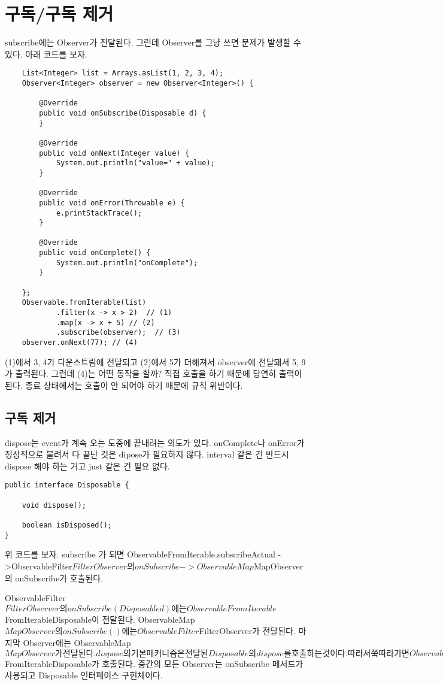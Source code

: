 \documentclass{book}
\begin{document}
\section{구독/구독 제거}
subscribe에는 Observer가 전달된다. 그런데 Observer를 그냥 쓰면 문제가 발생할 수 있다.
아래 코드를 보자.
\begin{verbatim}
	List<Integer> list = Arrays.asList(1, 2, 3, 4);
	Observer<Integer> observer = new Observer<Integer>() {

		@Override
		public void onSubscribe(Disposable d) {
		}

		@Override
		public void onNext(Integer value) {
			System.out.println("value=" + value);
		}

		@Override
		public void onError(Throwable e) {
			e.printStackTrace();
		}

		@Override
		public void onComplete() {
			System.out.println("onComplete");
		}

	};
	Observable.fromIterable(list)
			.filter(x -> x > 2)  // (1)
			.map(x -> x + 5) // (2)
			.subscribe(observer);  // (3)
	observer.onNext(77); // (4)		
\end{verbatim}
(1)에서 3, 4가 다운스트림에 전달되고 (2)에서 5가 더해져서 observer에 전달돼서 5, 9가 출력된다.
그런데 (4)는 어떤 동작을 할까? 
직접 호출을 하기 때문에 당연히 출력이 된다.
종료 상태에서는 호출이 안 되어야 하기 때문에 규칙 위반이다.


\subsection{구독 제거}
dispose는 event가 계속 오는 도중에 끝내려는 의도가 있다. onComplete나 onError가 정상적으로 불려서 다 끝난 것은 dipose가 필요하지 않다.
interval 같은 건 반드시 dispose  해야 하는 거고 just 같은 건 필요 없다.


\begin{verbatim}
public interface Disposable {

    void dispose();

    boolean isDisposed();
}
\end{verbatim}

위 코드를 보자.
subscribe 가 되면 
ObservableFromIterable.subscribeActual
->ObservableFilter$FilterObserver의 onSubscribe
->ObservableMap$MapObserver의 onSubscribe가 호출된다.

ObservableFilter$FilterObserver의 onSubscribe(Disposable d)에는 
ObservableFromIterable$FromIterableDisposable이 전달된다.
ObservableMap$MapObserver의 onSubscribe()에는 ObservableFilter$FilterObserver가 전달된다.
마지막 Observer에는 ObservableMap$MapObserver가 전달된다.
dispose의 기본 매커니즘은 전달된 Disposable의 dispose를 호출하는 것이다.
따라서 쭉 따라가면 ObservableFromIterable$FromIterableDisposable가  호출된다.
중간의 모든 Observer는 onSubscribe 메서드가 사용되고 Disposable 인터페이스 구현체이다.
\end{document}
